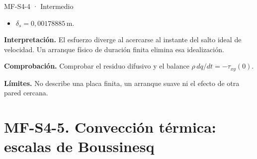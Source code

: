 \begin{studiumworked}{MF-S4-4 · Intermedio}
\begin{itemize}
\item $\delta_s=0{,}00178885\,\mathrm{m}$.

\end{itemize}

\textbf{Interpretación.} El esfuerzo diverge al acercarse al instante del salto ideal de velocidad. Un arranque físico de duración finita elimina esa idealización.

\textbf{Comprobación.} Comprobar el residuo difusivo y el balance $\rho\,dq/dt=-\tau_{xy}(0)$.

\textbf{Límites.} No describe una placa finita, un arranque suave ni el efecto de otra pared cercana.

\end{studiumworked}

\Needspace{.30\textheight}\section{MF-S4-5. Convección térmica: escalas de Boussinesq}

